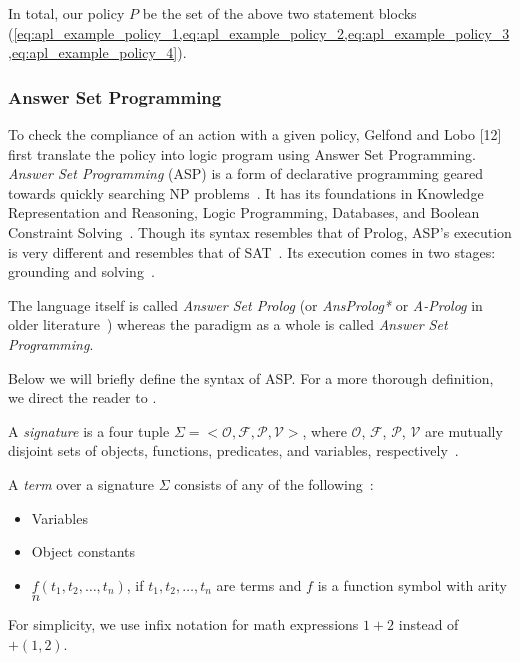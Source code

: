 In total, our policy $P$ be the set of the above two statement blocks (\cref{eq:apl_example_policy_1,eq:apl_example_policy_2,eq:apl_example_policy_3,eq:apl_example_policy_4}).

\subsubsection{Answer Set Programming}
\label{subsubsec:asp}

To check the compliance of an action with a given policy, Gelfond and Lobo [12] first translate the policy into logic program using Answer Set Programming.
\textit{Answer Set Programming} (ASP) is a form of declarative programming geared towards quickly searching NP problems~\citep{vladimir_lifschitz_what_2008}.
It has its foundations in Knowledge Representation and Reasoning, Logic Programming, Databases, and Boolean Constraint Solving~\citep{gebser_potassco_2011}.
Though its syntax resembles that of Prolog, ASP's execution is very different and resembles that of SAT~\citep{gebser_potassco_2011,vladimir_lifschitz_what_2008}.
Its execution comes in two stages: grounding and solving~\citep{gebser_potassco_2011}.

The language itself is called \textit{Answer Set Prolog} (or \textit{AnsProlog*} or \textit{A-Prolog} in older literature~\citep{baral_answer_2004}) whereas the paradigm as a whole is called \textit{Answer Set Programming}.


Below we will briefly define the syntax of ASP.
For a more thorough definition, we direct the reader to \citet{calimeri_asp-core-2_2020,gebser_abstract_2015}.

\begin{definition}
    A \textit{signature} is a four tuple $\Sigma = <\mathcal{O}, \mathcal{F}, \mathcal{P}, \mathcal{V}>$, where $\mathcal{O}$, $\mathcal{F}$, $\mathcal{P}$, $\mathcal{V}$ are mutually disjoint sets of objects, functions, predicates, and variables, respectively~\citep{blount_architecture_2013}.
\end{definition}

\begin{definition}
    A \textit{term} over a signature $\Sigma$ consists of any of the following~\citep{blount_architecture_2013}:
    \begin{itemize}
        \item Variables
        \item Object constants
        \item $f(t_1, t_2, \dots, t_n)$, if $t_1, t_2, \dots, t_n$ are terms and $f$ is a function symbol with arity $n$
    \end{itemize}
    For simplicity, we use infix notation for math expressions $1+2$ instead of $+(1, 2)$.
\end{definition}

